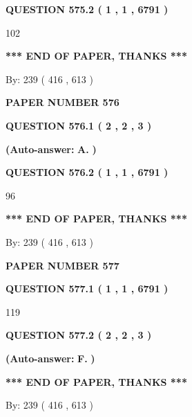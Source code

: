 \documentclass[12pt]{article}
\begin{document}
  
{\textbf{\large{QUESTION
575.2 
 ( 1 , 1 , 6791 )
}}}

102
   
   
   
   
\vspace{1.0in} 
{\textbf{\large{ *** END OF PAPER, THANKS *** }}} 
   
   
\hspace{1.0in} By: 
 239 ( 416 ,  613 )
   
   
   
   
\newpage 
\setcounter{page}{ 
   576001 } 
   
   
 {\textbf{ \Large{ PAPER NUMBER  576  }}}
   
   
   
   
  
  
{\textbf{\large{QUESTION
576.1 
 ( 2 , 2 , 3 )
}}}
 
 
{\textbf{(Auto-answer:}}
{\textbf{\large{
A.}}}
{\textbf{)}}
 
 
  
  
{\textbf{\large{QUESTION
576.2 
 ( 1 , 1 , 6791 )
}}}

96
   
   
   
   
\vspace{1.0in} 
{\textbf{\large{ *** END OF PAPER, THANKS *** }}} 
   
   
\hspace{1.0in} By: 
 239 ( 416 ,  613 )
   
   
   
   
\newpage 
\setcounter{page}{ 
   577001 } 
   
   
 {\textbf{ \Large{ PAPER NUMBER  577  }}}
   
   
   
   
  
  
{\textbf{\large{QUESTION
577.1 
 ( 1 , 1 , 6791 )
}}}

119
  
  
{\textbf{\large{QUESTION
577.2 
 ( 2 , 2 , 3 )
}}}
 
 
{\textbf{(Auto-answer:}}
{\textbf{\large{
F.}}}
{\textbf{)}}
 
 
   
   
   
   
\vspace{1.0in} 
{\textbf{\large{ *** END OF PAPER, THANKS *** }}} 
   
   
\hspace{1.0in} By: 
 239 ( 416 ,  613 )
   
   
   
\end{document}
